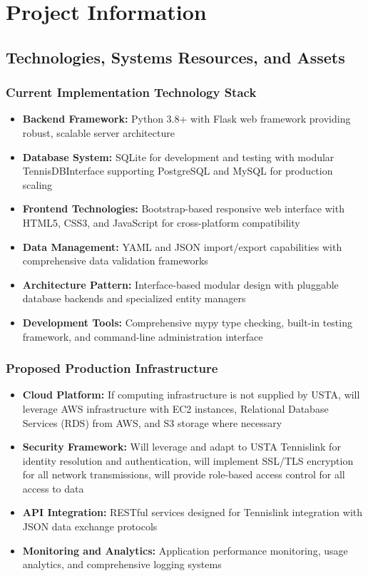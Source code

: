 \section{Project Information}

\subsection{Technologies, Systems Resources, and Assets}

\subsubsection{Current Implementation Technology Stack}
\begin{itemize}
    \item \textbf{Backend Framework:} Python 3.8+ with Flask web framework providing robust, scalable server architecture
    \item \textbf{Database System:} SQLite for development and testing with modular TennisDBInterface supporting PostgreSQL and MySQL for production scaling
    \item \textbf{Frontend Technologies:} Bootstrap-based responsive web interface with HTML5, CSS3, and JavaScript for cross-platform compatibility
    \item \textbf{Data Management:} YAML and JSON import/export capabilities with comprehensive data validation frameworks
    \item \textbf{Architecture Pattern:} Interface-based modular design with pluggable database backends and specialized entity managers
    \item \textbf{Development Tools:} Comprehensive mypy type checking, built-in testing framework, and command-line administration interface
\end{itemize}

\subsubsection{Proposed Production Infrastructure}
\begin{itemize}
    \item \textbf{Cloud Platform:} If computing infrastructure is not supplied by USTA, will leverage AWS infrastructure with EC2 instances, Relational Database Services (RDS) from AWS, and S3 storage where necessary
    \item \textbf{Security Framework:} Will leverage and adapt to USTA Tennislink for identity resolution and authentication, will implement SSL/TLS encryption for all network transmissions, will provide role-based access control for all access to data
    \item \textbf{API Integration:} RESTful services designed for Tennislink integration with JSON data exchange protocols
    \item \textbf{Monitoring and Analytics:} Application performance monitoring, usage analytics, and comprehensive logging systems 
\end{itemize}

